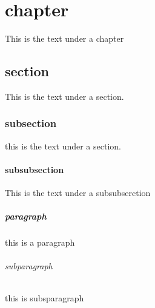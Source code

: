 \chapter{chapter}
This is the text under a chapter 

\section{section}

This is the text under a section. 
\subsection{subsection}
this is the text under a section.

\subsubsection{subsubsection}

This is the text under a subsubserction

\paragraph{paragraph}

this is a paragraph

\subparagraph{subparagraph}

this is subsparagraph 